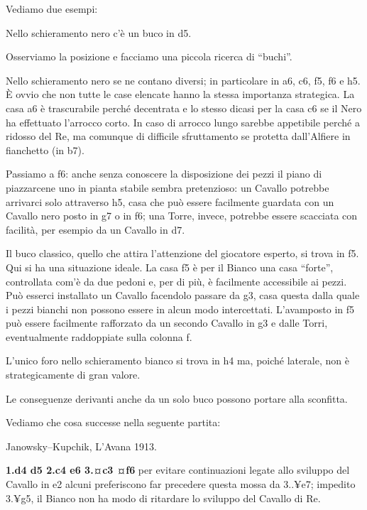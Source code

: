 Vediamo due esempi:


Nello schieramento nero c'è un buco in d5.


Osserviamo la posizione e facciamo una piccola ricerca di ``buchi''.

Nello schieramento nero se ne contano diversi; in particolare in a6, c6,
f5, f6 e h5. È ovvio che non tutte le case elencate hanno la stessa
importanza strategica. La casa a6 è trascurabile perché decentrata e lo
stesso dicasi per la casa c6 se il Nero ha effettuato l'arrocco corto.
In caso di arrocco lungo sarebbe appetibile perché a ridosso del Re, ma
comunque di difficile sfruttamento se protetta dall'Alfiere in
fianchetto (in b7).

Passiamo a f6: anche senza conoscere la disposizione dei pezzi il piano
di piazzarcene uno in pianta stabile sembra pretenzioso: un Cavallo
potrebbe arrivarci solo attraverso h5, casa che può essere facilmente
guardata con un Cavallo nero posto in g7 o in f6; una Torre, invece,
potrebbe essere scacciata con facilità, per esempio da un Cavallo in d7.

Il buco classico, quello che attira l'attenzione del giocatore esperto,
si trova in f5. Qui si ha una situazione ideale. La casa f5 è per il
Bianco una casa ``forte'', controllata com'è da due pedoni e, per di
più, è facilmente accessibile ai pezzi. Può esserci installato un
Cavallo facendolo passare da g3, casa questa dalla quale i pezzi bianchi
non possono essere in alcun modo intercettati. L'avamposto in f5 può
essere facilmente rafforzato da un secondo Cavallo in g3 e dalle Torri,
eventualmente raddoppiate sulla colonna f.

L'unico foro nello schieramento bianco si trova in h4 ma, poiché
laterale, non è strategicamente di gran valore.

Le conseguenze derivanti anche da un solo buco possono portare alla
sconfitta.

Vediamo che cosa successe nella seguente partita:

Janowsky--Kupchik, L'Avana 1913.

\textbf{1.d4 d5 2.c4 e6 3.¤c3 ¤f6} per evitare continuazioni legate allo
sviluppo del Cavallo in e2 alcuni preferiscono far precedere questa
mossa da 3..¥e7; impedito 3.¥g5, il Bianco non ha modo di ritardare lo
sviluppo del Cavallo di Re.

